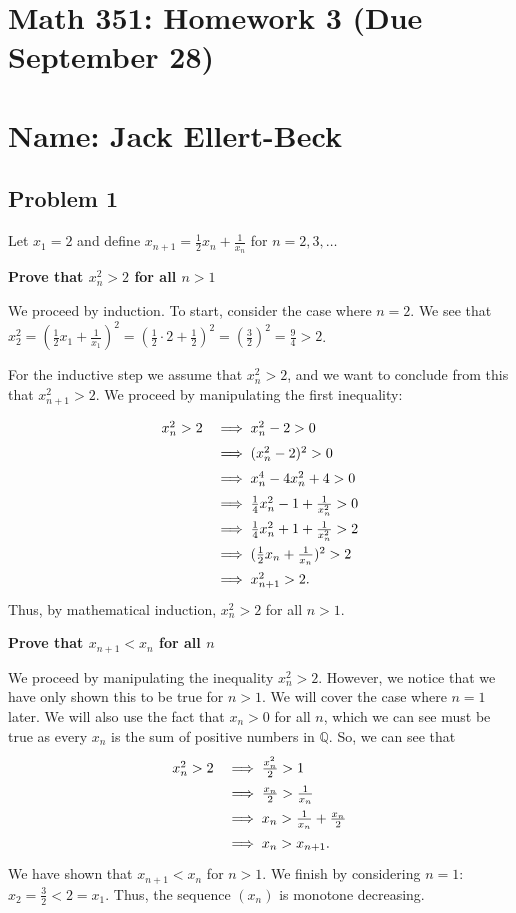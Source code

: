\documentclass[11pt]{article}
\newcommand{\Q}{\mathbb{Q}}
\begin{document}
\setlength{\parindent}{0pt}
\setlength{\parskip}{9pt}


\section*{Math 351: Homework 3 (Due September 28)}
\section*{Name: Jack Ellert-Beck}

\bigskip

\subsection*{Problem 1}
Let $x_1 = 2$ and define $x_{n+1} = \frac{1}{2}x_n+\frac{1}{x_n}$ for 
$n = 2, 3,\ldots$

\textbf{Prove that $x_n^2>2$ for all $n>1$}

We proceed by induction. To start, consider the case where $n=2$. We see that
$x_2^2 = (\frac{1}{2}x_1+\frac{1}{x_1})^2 = (\frac{1}{2}\cdot2+\frac{1}{2})^2
= (\frac{3}{2})^2 = \frac{9}{4} > 2$.

For the inductive step we assume that $x_n^2>2$, and we want to conclude from
this that $x_{n+1}^2>2$. We proceed by manipulating the first inequality:
\[
\def\arraystretch{1.5}
\begin{array}{rl}
x_n^2>2 &\implies x_n^2-2>0 \\
&\implies (x_n^2-2)^2>0 \\
&\implies x_n^4-4x_n^2+4>0\\
&\implies \frac{1}{4}x_n^2-1+\frac{1}{x_n^2}>0\\
&\implies \frac{1}{4}x_n^2+1+\frac{1}{x_n^2}>2\\
&\implies (\frac{1}{2}x_n+\frac{1}{x_n})^2 > 2\\
&\implies x_{n+1}^2 > 2.
\end{array}
\]
Thus, by mathematical induction, $x_n^2>2$ for all $n>1$.

\textbf{Prove that $x_{n+1} < x_n$ for all $n$}

We proceed by manipulating the inequality $x_n^2>2$. However, we notice that
we have only shown this to be true for $n>1$. We will cover the case where
$n=1$ later. We will also use the fact that $x_n > 0$ for all $n$, which we can
see must be true as every $x_n$ is the sum of positive numbers in $\Q$. 
So, we can see that
\[
\def\arraystretch{1.5}
\begin{array}{rl}
x_n^2>2&\implies \frac{x_n^2}{2}>1 \\
&\implies\frac{x_n}{2}>\frac{1}{x_n} \\
&\implies x_n > \frac{1}{x_n} + \frac{x_n}{2} \\
&\implies x_n > x_{n+1}.
\end{array}
\]
We have shown that $x_{n+1}<x_n$ for $n>1$. We finish by considering $n=1$:
$x_2=\frac{3}{2}<2=x_1$. Thus, the sequence $(x_n)$ is monotone decreasing.
\end{document}
